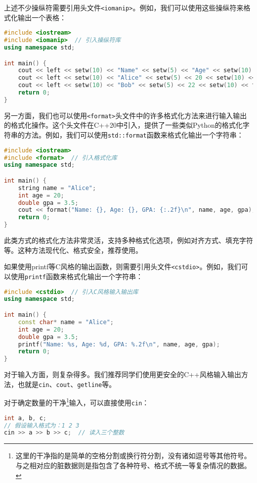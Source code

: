 上述不少操纵符需要引用头文件\texttt{<iomanip>}。例如，我们可以使用这些操纵符来格式化输出一个表格：
\begin{lstlisting}[language=C++]
#include <iostream>
#include <iomanip>  // 引入操纵符库
using namespace std;

int main() {
    cout << left << setw(10) << "Name" << setw(5) << "Age" << setw(10) << "GPA" << endl;
    cout << left << setw(10) << "Alice" << setw(5) << 20 << setw(10) << fixed << setprecision(2) << 3.5 << endl;
    cout << left << setw(10) << "Bob" << setw(5) << 22 << setw(10) << fixed << setprecision(2) << 3.8 << endl;
    return 0;
}
\end{lstlisting}

另一方面，我们也可以使用\texttt{<format>}头文件中的许多格式化方法来进行输入输出的格式化操作。这个头文件在C++20中引入，提供了一些类似Python的格式化字符串的方法。例如，我们可以使用\texttt{std::format}函数来格式化输出一个字符串：
\begin{lstlisting}[language=C++]
#include <iostream>
#include <format>  // 引入格式化库
using namespace std;

int main() {
    string name = "Alice";
    int age = 20;
    double gpa = 3.5;
    cout << format("Name: {}, Age: {}, GPA: {:.2f}\n", name, age, gpa);
    return 0;
}
\end{lstlisting}
此类方式的格式化方法非常灵活，支持多种格式化选项，例如对齐方式、填充字符等。这种方法现代化、格式安全，推荐使用。

如果使用{printf}等C风格的输出函数，则需要引用头文件\texttt{<cstdio>}。例如，我们可以使用\texttt{printf}函数来格式化输出一个字符串：
\begin{lstlisting}[language=C++]
#include <cstdio>  // 引入C风格输入输出库
using namespace std;

int main() {
    const char* name = "Alice";
    int age = 20;
    double gpa = 3.5;
    printf("Name: %s, Age: %d, GPA: %.2f\n", name, age, gpa);
    return 0;
}
\end{lstlisting}

对于输入方面，则复杂得多。我们推荐同学们使用更安全的C++风格输入输出方法，也就是\texttt{cin}、\texttt{cout}、\texttt{getline}等。

对于确定数量的干净\footnote{这里的干净指的是简单的空格分割或换行符分割，没有诸如逗号等其他符号。与之相对应的脏数据则是指包含了各种符号、格式不统一等复杂情况的数据。}输入，可以直接使用\texttt{cin}：
\begin{lstlisting}[language=C++]
int a, b, c;
// 假设输入格式为：1 2 3
cin >> a >> b >> c;  // 读入三个整数
\end{lstlisting}

